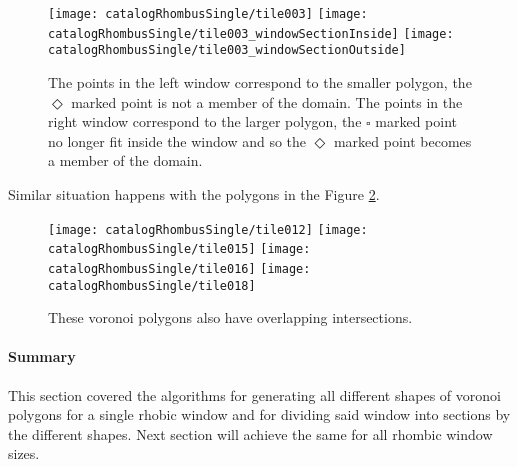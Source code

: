 \documentclass[text.tex]{subfiles}
\begin{document}
\begin{figure}[h]
\centering
\texttt{[image: catalogRhombusSingle/tile003]}
\texttt{[image: catalogRhombusSingle/tile003\_windowSectionInside]}
\texttt{[image: catalogRhombusSingle/tile003\_windowSectionOutside]}
\caption{The points in the left window correspond to the smaller polygon, the {\scriptsize $\Diamond$} marked point is not a member of the domain. The points in the right window correspond to the larger polygon, the {\scriptsize $\square$} marked point no longer fit inside the window and so the {\scriptsize $\Diamond$} marked point becomes a member of the domain.}
\label{fig:intersectionOverlap}
\end{figure}

Similar situation happens with the polygons in the Figure \ref{fig:morePolygonsExample}.

\begin{figure}[h]
\centering
\texttt{[image: catalogRhombusSingle/tile012]}
\texttt{[image: catalogRhombusSingle/tile015]}
\texttt{[image: catalogRhombusSingle/tile016]}
\texttt{[image: catalogRhombusSingle/tile018]}
\caption{These voronoi polygons also have overlapping intersections.}
\label{fig:morePolygonsExample}
\end{figure}

\paragraph{Summary}
This section covered the algorithms for generating all different shapes of voronoi polygons for a single rhobic window and for dividing said window into sections by the different shapes. Next section will achieve the same for all rhombic window sizes.
\end{document}
